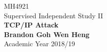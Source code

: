 \documentclass[a4paper,12pt]{article}
\begin{document}
	\begin{titlepage}
		\begin{center}
			\vspace*{9em}
			\Huge 
			MH4921\\ Supervised Independent Study II\\
			\vspace*{4em}
			\LARGE
			\textbf{TCP/IP Attack}\\		
			\vspace{4em}
			\textbf{Brandon Goh Wen Heng}\\
			\vspace*{4em}
			Academic Year 2018/19
			\vfill
		\end{center}
	\end{titlepage}
	
	\tableofcontents
	\newpage
\end{document}
